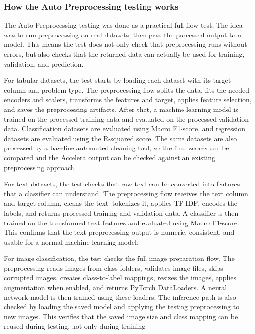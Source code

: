 \documentclass[12pt,a4paper,oneside]{report}
\begin{document}
\subsubsection{How the Auto Preprocessing testing works}

The Auto Preprocessing testing was done as a practical full-flow test. The idea
was to run preprocessing on real datasets, then pass the processed output to a
model. This means the test does not only check that preprocessing runs without
errors, but also checks that the returned data can actually be used for
training, validation, and prediction.

\noindent For tabular datasets, the test starts by loading each dataset with its
target column and problem type. The preprocessing flow splits the data, fits the
needed encoders and scalers, transforms the features and target, applies feature
selection, and saves the preprocessing artifacts. After that, a machine learning
model is trained on the processed training data and evaluated on the processed
validation data. Classification datasets are evaluated using Macro F1-score,
and regression datasets are evaluated using the R-squared score. The same
datasets are also processed by a baseline automated cleaning tool, so the final
scores can be compared and the Accelera output can be checked against an
existing preprocessing approach.

\noindent For text datasets, the test checks that raw text can be converted into
features that a classifier can understand. The preprocessing flow receives the
text column and target column, cleans the text, tokenizes it, applies TF-IDF,
encodes the labels, and returns processed training and validation data. A
classifier is then trained on the transformed text features and evaluated using
Macro F1-score. This confirms that the text preprocessing output is numeric,
consistent, and usable for a normal machine learning model.

\noindent For image classification, the test checks the full image preparation
flow. The preprocessing reads images from class folders, validates image files,
skips corrupted images, creates class-to-label mappings, resizes the images,
applies augmentation when enabled, and returns PyTorch DataLoaders. A neural
network model is then trained using these loaders. The inference path is also
checked by loading the saved model and applying the testing preprocessing to new
images. This verifies that the saved image size and class mapping can be reused
during testing, not only during training.
\end{document}
